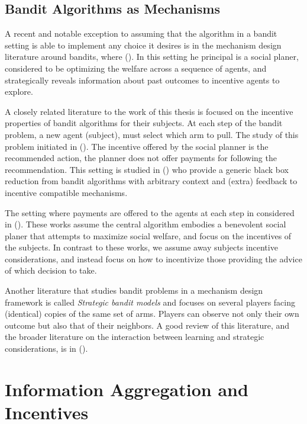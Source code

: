 \subsection{Bandit Algorithms as Mechanisms}


A recent and notable exception to assuming that the algorithm in a bandit setting is able to implement any choice it desires is in the mechanism design literature around bandits, where (\cite{kremer2014implementing,mansour2015bayesian}).
In this setting he principal is a social planer,  considered to be optimizing the welfare across a sequence of agents, and strategically reveals information about past outcomes to incentive agents to explore.

A closely related literature to the work of this thesis is focused on the incentive properties of bandit algorithms for their subjects.
At each step of the bandit problem, a new agent (subject), must select which arm to pull. 
The study of this problem initiated in (\cite{kremer2014implementing}).
The  incentive offered by the social planner is the recommended action, the planner does not offer payments for following the recommendation. This setting is studied in (\cite{mansour2015bayesian}) who provide a generic black box reduction from bandit algorithms with arbitrary context and (extra) feedback to incentive compatible mechanisms.

The setting where payments are offered to the agents at each step in considered in (\cite{frazier2014incentivizing}).
These works assume the central algorithm embodies a benevolent social planer that attempts to maximize social welfare, and focus on the incentives of the subjects.
In contrast to these works, we assume away subjects incentive considerations, and instead focus on how to incentivize those providing the advice of which decision to take.

Another literature that studies bandit problems in a mechanism design framework is called \emph{Strategic bandit models} and focuses on several players facing (identical) copies of the same set of arms. Players can observe not only their own outcome but also that of their neighbors. A good review of this literature, and the broader literature on the interaction between learning and strategic considerations, is in (\cite{horner2016learning}).

\section{Information Aggregation and Incentives}



